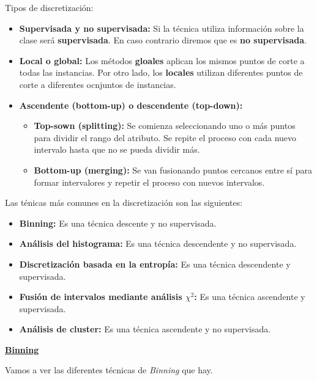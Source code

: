 \documentclass[12pt, letterpaper]{article}
\begin{document}
Tipos de discretización:
\begin{itemize}
    \item \textbf{Supervisada y no supervisada:} Si la técnica utiliza información sobre la clase será \textbf{supervisada}. En caso contrario diremos que es \textbf{no supervisada}.
    \item \textbf{Local o global:} Los métodos \textbf{gloales} aplican los mismos puntos de corte a todas las instancias. Por otro lado, los \textbf{locales} utilizan diferentes puntos de corte a diferentes ocnjuntos de instancias.
    \item \textbf{Ascendente (bottom-up) o descendente (top-down):}
    \begin{itemize}
        \item \textbf{Top-sown (splitting):} Se comienza seleccionando uno o más puntos para dividir el rango del atributo. Se repite el proceso con cada nuevo intervalo hasta que no se pueda dividir más.
        \item \textbf{Bottom-up (merging):} Se van fusionando puntos cercanos entre sí para formar intervalores y repetir el proceso con nuevos intervalos.
    \end{itemize}
\end{itemize}

Las ténicas más comunes en la discretización son las siguientes:
\begin{itemize}
    \item \textbf{Binning:} Es una técnica descente y no supervisada. 
    \item \textbf{Análisis del histograma:} Es una técnica descendente y no supervisada.
    \item \textbf{Discretización basada en la entropía:} Es una técnica descendente y supervisada.
    \item \textbf{Fusión de intervalos mediante análisis $\chi^2$:} Es una técnica ascendente y supervisada.
    \item \textbf{Análisis de cluster:} Es una técnica ascendente y no supervisada.
\end{itemize}

\vspace{1 em}
\underline{\textbf{Binning}}

Vamos a ver las diferentes técnicas de \textit{Binning} que hay.
\end{document}
